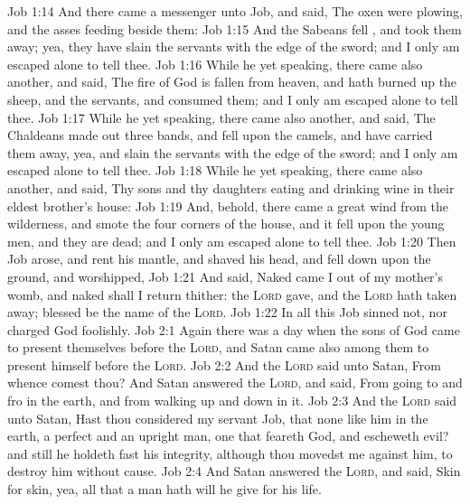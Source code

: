 \vs Job 1:14 And there came a messenger unto Job, and said, The oxen were plowing, and the asses feeding beside them:
\vs Job 1:15 And the Sabeans fell , and took them away; yea, they have slain the servants with the edge of the sword; and I only am escaped alone to tell thee.
\vs Job 1:16 While he  yet speaking, there came also another, and said, The fire of God is fallen from heaven, and hath burned up the sheep, and the servants, and consumed them; and I only am escaped alone to tell thee.
\vs Job 1:17 While he  yet speaking, there came also another, and said, The Chaldeans made out three bands, and fell upon the camels, and have carried them away, yea, and slain the servants with the edge of the sword; and I only am escaped alone to tell thee.
\vs Job 1:18 While he  yet speaking, there came also another, and said, Thy sons and thy daughters  eating and drinking wine in their eldest brother's house:
\vs Job 1:19 And, behold, there came a great wind from the wilderness, and smote the four corners of the house, and it fell upon the young men, and they are dead; and I only am escaped alone to tell thee.
\vs Job 1:20 Then Job arose, and rent his mantle, and shaved his head, and fell down upon the ground, and worshipped,
\vs Job 1:21 And said, Naked came I out of my mother's womb, and naked shall I return thither: the \textsc{Lord} gave, and the \textsc{Lord} hath taken away; blessed be the name of the \textsc{Lord}.
\vs Job 1:22 In all this Job sinned not, nor charged God foolishly.
\vs Job 2:1 Again there was a day when the sons of God came to present themselves before the \textsc{Lord}, and Satan came also among them to present himself before the \textsc{Lord}.
\vs Job 2:2 And the \textsc{Lord} said unto Satan, From when\-ce comest thou? And Satan answered the \textsc{Lord}, and said, From going to and fro in the earth, and from walking up and down in it.
\vs Job 2:3 And the \textsc{Lord} said unto Satan, Hast thou considered my servant Job, that  none like him in the earth, a perfect and an upright man, one that feareth God, and escheweth evil? and still he holdeth fast his integrity, although thou movedst me against him, to destroy him without cause.
\vs Job 2:4 And Satan answered the \textsc{Lord}, and said, Skin for skin, yea, all that a man hath will he give for his life.

